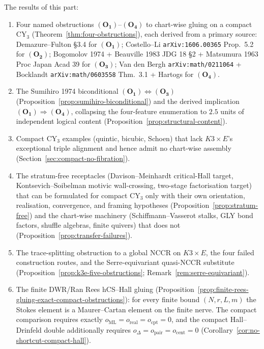 The results of this part:
\begin{enumerate}[leftmargin=2em]
\item Four named obstructions $(\mathbf{O_1})$--$(\mathbf{O_4})$
 to chart-wise gluing on a compact CY$_3$
 (Theorem~\ref{thm:four-obstructions}), each derived from a primary
 source: Demazure--Fulton \S3.4 for $(\mathbf{O_1})$; Costello--Li
 \texttt{arXiv:1606.00365} Prop.~5.2 for $(\mathbf{O_2})$; Bogomolov
 1974 + Beauville 1983 JDG 18 \S2 + Matsumura 1963 Proc Japan Acad 39
 for $(\mathbf{O_3})$; Van den Bergh \texttt{arXiv:math/0211064} +
 Bocklandt \texttt{arXiv:math/0603558} Thm.~3.1 + Hartogs for
 $(\mathbf{O_4})$.
\item The Sumihiro 1974 biconditional $(\mathbf{O_1}) \Leftrightarrow
 (\mathbf{O_3})$ (Proposition~\ref{prop:sumihiro-biconditional}) and
 the derived implication $(\mathbf{O_1}) \Rightarrow (\mathbf{O_4})$,
 collapsing the four-feature enumeration to $2.5$ units of independent
 logical content (Proposition~\ref{prop:structural-content}).
\item Compact CY$_3$ examples (quintic, bicubic, Schoen) that lack
 $K3 \times E$'s exceptional triple alignment and hence admit no
 chart-wise assembly (Section~\ref{sec:compact-no-fibration}).
\item The stratum-free receptacles (Davison--Meinhardt critical-Hall
 target, Kontsevich--Soibelman motivic wall-crossing, two-stage
 factorisation target) that can be formulated for compact CY$_3$ only
 with their own orientation, realisation, convergence, and framing
 hypotheses
 (Proposition~\ref{prop:stratum-free}) and the chart-wise machinery
 (Schiffmann--Vasserot stalks, GLY bond factors, shuffle algebras,
 finite quivers) that does not
 (Proposition~\ref{prop:transfer-failures}).
\item The trace-splitting obstruction to a global NCCR on
 \(K3\times E\), the four failed construction routes, and the
 Serre-equivariant quasi-NCCR substitute
 (Proposition~\ref{prop:k3e-five-obstructions};
 Remark~\ref{rem:serre-equivariant}).
\item The finite DWR/Ran Rees hCS--Hall gluing
 (Proposition~\ref{prop:finite-rees-gluing-exact-compact-obstructions}):
 for every finite bound $(N,r,L,m)$ the Stokes element is a
 Maurer--Cartan element on the finite nerve. The compact comparison
 requires exactly
 $o_{\mathrm{ML}}=o_{\mathrm{real}}=o_{\mathrm{cpt}}=0$, and the
 compact Hall--Drinfeld double additionally requires
 $o_\Delta=o_{\mathrm{pair}}=o_{\mathrm{cent}}=0$
 (Corollary~\ref{cor:no-shortcut-compact-hall}).

\end{enumerate}
